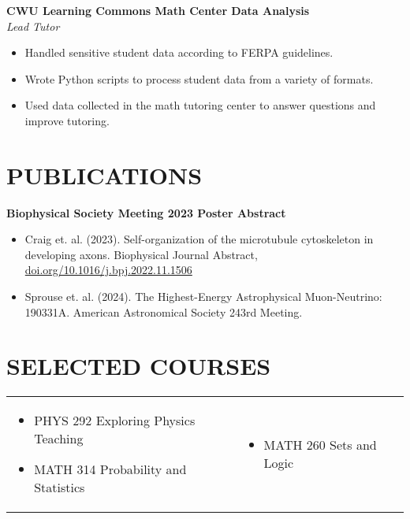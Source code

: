 \documentclass[a4paper,9pt]{extarticle}
\begin{document}
\noindent
\textbf{CWU Learning Commons Math Center Data Analysis}\\
\textit{Lead Tutor}
\begin{itemize}
    \item Handled sensitive student data according to FERPA guidelines.
    \item Wrote Python scripts to process student data from a variety of formats.
    \item Used data collected in the math tutoring center to answer questions and improve tutoring.
\end{itemize}

\section*{PUBLICATIONS}
\noindent
\textbf{Biophysical Society Meeting 2023 Poster Abstract}
\begin{itemize}
    \item Craig et. al. (2023). Self-organization of the microtubule cytoskeleton in developing axons. Biophysical Journal Abstract, \href{doi.org/10.1016/j.bpj.2022.11.1506}{doi.org/10.1016/j.bpj.2022.11.1506}
    \item Sprouse et. al. (2024). The Highest-Energy Astrophysical Muon-Neutrino: 190331A. American Astronomical Society 243rd Meeting.
\end{itemize}

\section*{SELECTED COURSES}
\begin{tabularx}{1\textwidth}{>{\raggedright\arraybackslash}X >{\raggedright\arraybackslash}X }
    \vspace{-0.2in}
    \begin{itemize}
        \item PHYS 292 Exploring Physics Teaching
        \item MATH 314 Probability and Statistics
    \end{itemize}
    & \vspace{-0.2in} \begin{itemize}
        \item MATH 260 Sets and Logic
    \end{itemize}
\end{tabularx}
\end{document}
